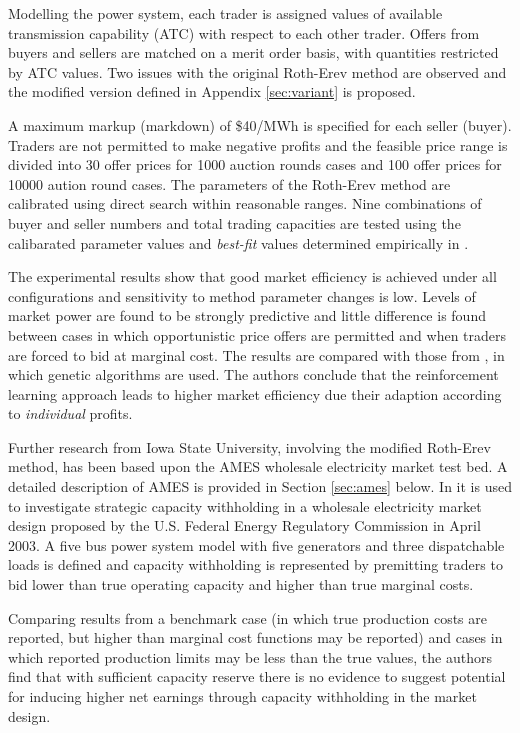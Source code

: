 Modelling the power system, each trader is assigned values of available
transmission capability (ATC) with respect to each other trader.  Offers from buyers and
sellers are matched on a merit order basis, with quantities restricted by
ATC values.  Two issues with the original Roth-Erev method are observed and
the modified version defined in Appendix \ref{sec:variant} is proposed.

A maximum markup (markdown) of \$40/MWh is specified for each seller (buyer).
Traders are not permitted to make negative profits and the feasible price range
is divided into 30 offer prices for 1000 auction rounds cases and 100 offer
prices for 10000 aution round cases.  The parameters of the Roth-Erev method are
calibrated using direct search within reasonable ranges.  Nine combinations of
buyer and seller numbers and total trading capacities are tested using the
calibarated parameter values and \textit{best-fit} values determined
empirically in \cite{roth:aer}.

The experimental results show that good market efficiency is achieved under all
configurations and sensitivity to method parameter changes is low.  Levels of
market power are found to be strongly predictive and little difference is found
between cases in which opportunistic price offers are permitted and when traders
are forced to bid at marginal cost.  The results are compared with those from
\cite{nicolaisen:2000}, in which genetic algorithms are used.  The authors
conclude that the reinforcement learning approach leads to higher market
efficiency due their adaption according to \textit{individual} profits.

Further research from Iowa State University, involving the modified Roth-Erev
method, has been based upon the AMES wholesale electricity market test bed.  A
detailed description of AMES is provided in Section \ref{sec:ames} below.  In
\cite{tesfatsi:psce} it is used to investigate strategic capacity
withholding in a wholesale electricity market design proposed by the U.S.
Federal Energy Regulatory Commission in April 2003.  A five bus power system model
with five generators and three dispatchable loads is defined and capacity
withholding is represented by premitting traders to bid lower than true
operating capacity and higher than true marginal costs.

Comparing results from a benchmark case (in which true production costs are
reported, but higher than marginal cost functions may be reported) and cases in
which reported production limits may be less than the true values, the authors
find that with sufficient capacity reserve there is no evidence to suggest
potential for inducing higher net earnings through capacity withholding in the
market design.

